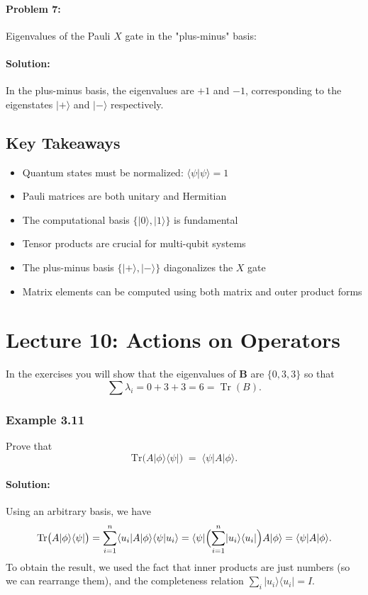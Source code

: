 \documentclass{article}
\begin{document}
\paragraph{Problem 7:} Eigenvalues of the Pauli \( X \) gate in the "plus-minus" basis:

\paragraph{Solution:}
In the plus-minus basis, the eigenvalues are \( +1 \) and \( -1 \), corresponding to the eigenstates \( |+\rangle \) and \( |-\rangle \) respectively.

\subsection{Key Takeaways}
\begin{conceptbox}
\begin{itemize}
    \item Quantum states must be normalized: \( \langle \psi | \psi \rangle = 1 \)
    \item Pauli matrices are both unitary and Hermitian
    \item The computational basis \( \{|0\rangle, |1\rangle\} \) is fundamental
    \item Tensor products are crucial for multi-qubit systems
    \item The plus-minus basis \( \{|+\rangle, |-\rangle\} \) diagonalizes the \( X \) gate
    \item Matrix elements can be computed using both matrix and outer product forms
\end{itemize}
\end{conceptbox}

\newpage
\section{Lecture 10: Actions on Operators}
In the exercises you will show that the eigenvalues of \(\mathbf{B}\) are \(\{0, 3, 3\}\) so that
\[
\sum \lambda_i = 0 + 3 + 3 = 6 = \operatorname{Tr}(B).
\]

\subsubsection{Example 3.11}
Prove that
\[
\mathrm{Tr}\bigl(A \lvert\phi\rangle\langle\psi\rvert \bigr) \;=\; \langle\psi \lvert A \lvert\phi\rangle.
\]

\paragraph{Solution:}
Using an arbitrary basis, we have
\[
\mathrm{Tr}\bigl(A \lvert\phi\rangle\langle\psi\rvert \bigr)
= \sum_{i=1}^{n} \langle u_i \lvert A \lvert \phi\rangle \langle\psi \lvert u_i\rangle
= \langle \psi \lvert \Bigl(\sum_{i=1}^{n} \lvert u_i\rangle \langle u_i\rvert\Bigr) A \lvert\phi\rangle
= \langle\psi \lvert A \lvert\phi\rangle.
\]
To obtain the result, we used the fact that inner products are just numbers (so we can rearrange them), and the completeness relation \(\sum_i |u_i\rangle \langle u_i| = I\).
\end{document}
